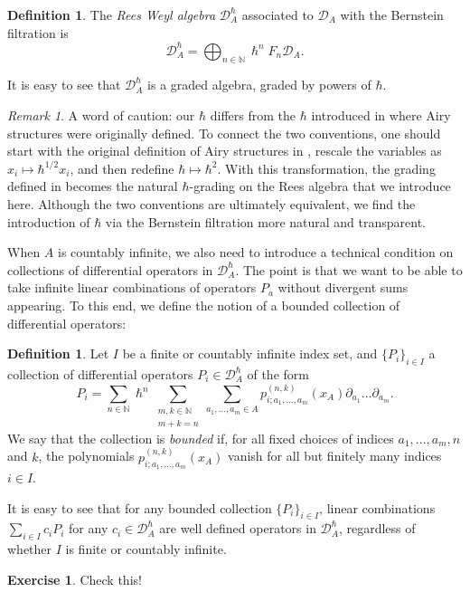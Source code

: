 \documentclass[reqno,oneside,11pt]{amsart}
\theoremstyle{plain}
\theoremstyle{definition}
\newtheorem{definition}[theorem]{Definition}
\newtheorem*{exercise}{Exercise}
\theoremstyle{remark}
\newtheorem{remark}[theorem]{Remark}
\numberwithin{equation}{section}
\newcommand{\DAh}{\mathcal{D}_A^{\hbar}}
\begin{document}
\begin{definition}\label{d:rees}
The \emph{Rees Weyl algebra} $\mathcal{D}_A^\hslash$ associated to $\mathcal{D}_A$ with the Bernstein filtration is
\begin{equation}
\mathcal{D}_A^\hslash = \bigoplus_{n \in \mathbb{N}} \hslash^n F_n \mathcal{D}_A.
\end{equation}
\end{definition}
It is easy to see that $\DAh$ is a graded algebra, graded by powers of $\hbar$.
 
  \begin{remark}
A word of caution:  our $\hbar$ differs from the $\hbar$ introduced in \cite{KS17} where Airy structures were originally defined. To connect the two conventions, one should start with the original definition of Airy structures in \cite{KS17}, rescale the variables as $x_i \mapsto \hbar^{1/2} x_i$, and then redefine $\hbar \mapsto \hbar^2$. With this transformation, the grading defined in \cite{KS17} becomes the natural $\hbar$-grading on the Rees algebra that we introduce here. Although the two conventions are ultimately equivalent, we find the introduction of $\hbar$ via the Bernstein filtration more natural and transparent.
 \end{remark}

When $A$ is countably infinite, we also need to introduce a technical condition on collections of differential operators in $\DAh$. The point is that we want to be able to take infinite linear combinations of operators $P_a$ without divergent sums appearing. To this end, we define the notion of a bounded collection of differential operators:
\begin{definition}\label{d:bounded}
Let $I$ be a finite or countably infinite index set, and $\{P_i\}_{i \in I}$ a collection of differential operators $P_i \in \DAh$ of the form
\begin{equation}
P_i = \sum_{n \in \mathbb N} \hslash^n \sum_{\substack{m,k \in \mathbb N \\ m+k = n} }\sum_{a_1,\ldots, a_m \in A} p^{(n,k)}_{i;a_1,\ldots, a_m}(x_A) \partial_{a_1}\ldots \partial_{a_m}.
\end{equation}
We say that the collection is \emph{bounded} if, for all fixed choices of indices $ a_1,\ldots, a_m, n  $ and $ k $, the polynomials  $ p^{(n,k)}_{i;a_1,\ldots, a_m}(x_A) $ vanish for all but finitely many indices $ i \in I $.
\end{definition} 
It is easy to see that for any bounded collection $\{P_i\}_{i \in I}$, linear combinations $\sum_{i \in I} c_i P_i$ for any $c_i \in \DAh$ are well defined operators in $\DAh$, regardless of whether $I$ is finite or countably infinite.
\begin{exercise}
Check this!
\end{exercise}
\end{document}
